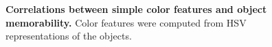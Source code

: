 \begin{figure}[t]
\centering
{}
\vspace{-5mm}\caption{\footnotesize\textbf{Correlations between simple color features and object memorability.} Color features were computed from HSV representations of the objects. }\label{fig:simple}
\end{figure}

